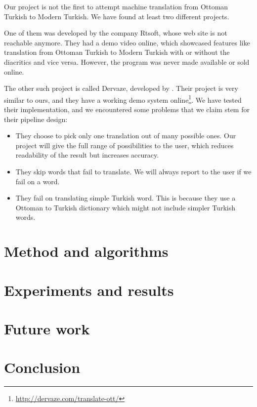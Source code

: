 \documentclass[10pt,twocolumn]{article}
\theoremstyle{nonumberplain}
\newcommand{\TODO}[1]{{\color{red}{[TODO: #1]}}}
\begin{document}
Our project is not the first to attempt machine translation from Ottoman Turkish to Modern Turkish. We have found at least two different projects.

One of them was developed by the company Rtsoft, whose web site is not reachable anymore. They had a demo video online, which showcased features like translation from Ottoman Turkish to Modern Turkish with or without the diacritics and vice versa. However, the program was never made available or sold online.

The other such project is called Dervaze, developed by \citet{dervaze}.
Their project is very similar to ours, and they have a working demo system
online\footnote{\url{http://dervaze.com/translate-ott/}}.
We have tested their implementation, and we encountered some problems that we claim stem for their pipeline design:
\begin{itemize}
\item They choose to pick only one translation out of many possible ones. Our project will give the full range of possibilities to the user, which reduces readability of the result but increases accuracy.
\item They skip words that fail to translate. We will always report to the user if we fail on a word.
\item They fail on translating simple Turkish word. This is because they use a Ottoman to Turkish dictionary which might not include simpler Turkish words.
\end{itemize}

\section{Method and algorithms}

\TODO{gotta write}

\section{Experiments and results}

\TODO{gotta write}

\section{Future work}

\TODO{gotta write}

\section{Conclusion}

\TODO{gotta write}



\end{document}
